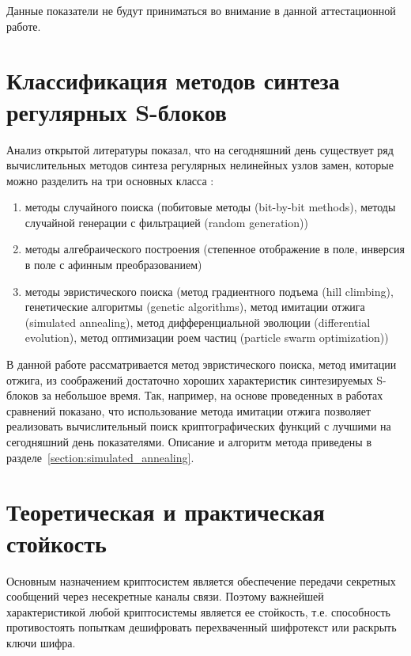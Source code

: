 Данные показатели не будут приниматься во внимание в данной аттестационной
работе.



\section{Классификация методов синтеза регулярных S-блоков}

Анализ открытой литературы показал, что на сегодняшний день существует ряд
вычислительных методов синтеза регулярных нелинейных узлов замен, которые можно
разделить на три основных класса \cite{Burnett,Connor,Millian1,Millian2,Clark1,Laskari,Tesar}:

\begin{enumerate}
    \item методы случайного поиска (побитовые методы (bit-by-bit methods),
        методы случайной генерации с фильтрацией (random generation))
    \item методы алгебраического построения (степенное отображение в поле,
        инверсия в поле с афинным преобразованием)
    \item методы эвристического поиска (метод градиентного подъема (hill climbing),
        генетические алгоритмы (genetic algorithms),
        метод имитации отжига (simulated annealing),
        метод дифференциальной эволюции (differential evolution),
        метод оптимизации роем частиц (particle swarm optimization))
\end{enumerate}

В данной работе рассматривается метод эвристического поиска, метод имитации
отжига, из соображений достаточно хороших характеристик синтезируемых S-блоков
за небольшое время. Так, например, на основе проведенных в работах
\cite{Clark1,Kavut} сравнений показано, что использование метода имитации отжига
позволяет реализовать вычислительный поиск криптографических функций с лучшими
на сегодняшний день показателями. Описание и алгоритм метода приведены в
разделе~\ref{section:simulated_annealing}.

\section{Теоретическая и практическая стойкость}

Основным назначением криптосистем является обеспечение передачи секретных
сообщений через несекретные каналы связи. Поэтому важнейшей характеристикой
любой криптосистемы является ее стойкость, т.е. способность противостоять
попыткам дешифровать перехваченный шифротекст или раскрыть ключи шифра.

